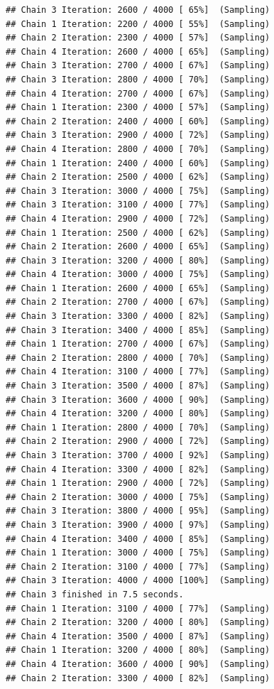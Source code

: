 \documentclass[
]{article}
\begin{document}
\begin{verbatim}
## Chain 3 Iteration: 2600 / 4000 [ 65%]  (Sampling) 
## Chain 1 Iteration: 2200 / 4000 [ 55%]  (Sampling) 
## Chain 2 Iteration: 2300 / 4000 [ 57%]  (Sampling) 
## Chain 4 Iteration: 2600 / 4000 [ 65%]  (Sampling) 
## Chain 3 Iteration: 2700 / 4000 [ 67%]  (Sampling) 
## Chain 3 Iteration: 2800 / 4000 [ 70%]  (Sampling) 
## Chain 4 Iteration: 2700 / 4000 [ 67%]  (Sampling) 
## Chain 1 Iteration: 2300 / 4000 [ 57%]  (Sampling) 
## Chain 2 Iteration: 2400 / 4000 [ 60%]  (Sampling) 
## Chain 3 Iteration: 2900 / 4000 [ 72%]  (Sampling) 
## Chain 4 Iteration: 2800 / 4000 [ 70%]  (Sampling) 
## Chain 1 Iteration: 2400 / 4000 [ 60%]  (Sampling) 
## Chain 2 Iteration: 2500 / 4000 [ 62%]  (Sampling) 
## Chain 3 Iteration: 3000 / 4000 [ 75%]  (Sampling) 
## Chain 3 Iteration: 3100 / 4000 [ 77%]  (Sampling) 
## Chain 4 Iteration: 2900 / 4000 [ 72%]  (Sampling) 
## Chain 1 Iteration: 2500 / 4000 [ 62%]  (Sampling) 
## Chain 2 Iteration: 2600 / 4000 [ 65%]  (Sampling) 
## Chain 3 Iteration: 3200 / 4000 [ 80%]  (Sampling) 
## Chain 4 Iteration: 3000 / 4000 [ 75%]  (Sampling) 
## Chain 1 Iteration: 2600 / 4000 [ 65%]  (Sampling) 
## Chain 2 Iteration: 2700 / 4000 [ 67%]  (Sampling) 
## Chain 3 Iteration: 3300 / 4000 [ 82%]  (Sampling) 
## Chain 3 Iteration: 3400 / 4000 [ 85%]  (Sampling) 
## Chain 1 Iteration: 2700 / 4000 [ 67%]  (Sampling) 
## Chain 2 Iteration: 2800 / 4000 [ 70%]  (Sampling) 
## Chain 4 Iteration: 3100 / 4000 [ 77%]  (Sampling) 
## Chain 3 Iteration: 3500 / 4000 [ 87%]  (Sampling) 
## Chain 3 Iteration: 3600 / 4000 [ 90%]  (Sampling) 
## Chain 4 Iteration: 3200 / 4000 [ 80%]  (Sampling) 
## Chain 1 Iteration: 2800 / 4000 [ 70%]  (Sampling) 
## Chain 2 Iteration: 2900 / 4000 [ 72%]  (Sampling) 
## Chain 3 Iteration: 3700 / 4000 [ 92%]  (Sampling) 
## Chain 4 Iteration: 3300 / 4000 [ 82%]  (Sampling) 
## Chain 1 Iteration: 2900 / 4000 [ 72%]  (Sampling) 
## Chain 2 Iteration: 3000 / 4000 [ 75%]  (Sampling) 
## Chain 3 Iteration: 3800 / 4000 [ 95%]  (Sampling) 
## Chain 3 Iteration: 3900 / 4000 [ 97%]  (Sampling) 
## Chain 4 Iteration: 3400 / 4000 [ 85%]  (Sampling) 
## Chain 1 Iteration: 3000 / 4000 [ 75%]  (Sampling) 
## Chain 2 Iteration: 3100 / 4000 [ 77%]  (Sampling) 
## Chain 3 Iteration: 4000 / 4000 [100%]  (Sampling) 
## Chain 3 finished in 7.5 seconds.
## Chain 1 Iteration: 3100 / 4000 [ 77%]  (Sampling) 
## Chain 2 Iteration: 3200 / 4000 [ 80%]  (Sampling) 
## Chain 4 Iteration: 3500 / 4000 [ 87%]  (Sampling) 
## Chain 1 Iteration: 3200 / 4000 [ 80%]  (Sampling) 
## Chain 4 Iteration: 3600 / 4000 [ 90%]  (Sampling) 
## Chain 2 Iteration: 3300 / 4000 [ 82%]  (Sampling) 

\end{verbatim}
\end{document}
